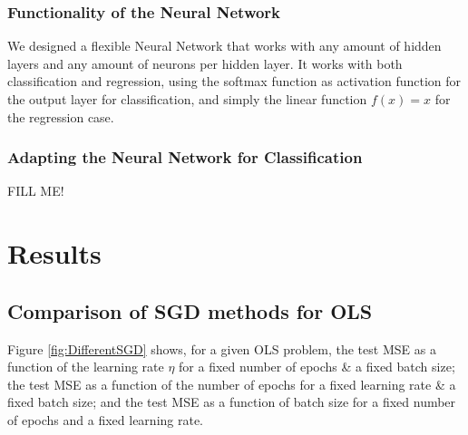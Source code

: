 \documentclass[11pt,a4paper,titlepage]{article}
\begin{document}
\subsubsection{Functionality of the Neural Network}
We designed a flexible Neural Network that works with any amount of hidden layers and any amount of neurons per hidden layer. It works with both classification and regression, using the softmax function as activation function for the output layer for classification, and simply the linear function $f(x)=x$ for the regression case. 
\subsubsection{Adapting the Neural Network for Classification}
FILL ME!
\section{Results}
\subsection{Comparison of SGD methods for OLS}
Figure \ref{fig:DifferentSGD} shows, for a given OLS problem, the test MSE as a function of the learning rate $\eta$ for a fixed number of epochs \& a fixed batch size; the test MSE as a function of the number of epochs for a fixed learning rate \& a fixed batch size; and the test MSE as a function of batch size for a fixed number of epochs and a fixed learning rate. 
\end{document}
